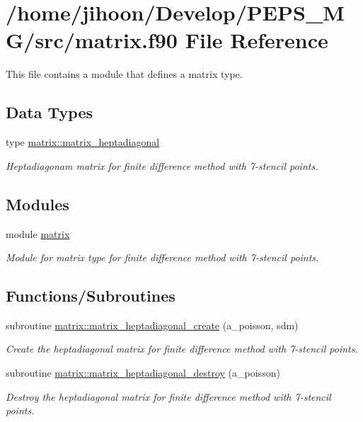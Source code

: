 \hypertarget{matrix_8f90}{}\section{/home/jihoon/\+Develop/\+P\+E\+P\+S\+\_\+\+M\+G/src/matrix.f90 File Reference}
\label{matrix_8f90}


This file contains a module that defines a matrix type.  


\subsection*{Data Types}
\begin{DoxyCompactItemize}
\item 
type \hyperlink{structmatrix_1_1matrix__heptadiagonal}{matrix\+::matrix\+\_\+heptadiagonal}
\begin{DoxyCompactList}\small\item\em Heptadiagonam matrix for finite difference method with 7-\/stencil points. \end{DoxyCompactList}\end{DoxyCompactItemize}
\subsection*{Modules}
\begin{DoxyCompactItemize}
\item 
module \hyperlink{namespacematrix}{matrix}
\begin{DoxyCompactList}\small\item\em Module for matrix type for finite difference method with 7-\/stencil points. \end{DoxyCompactList}\end{DoxyCompactItemize}
\subsection*{Functions/\+Subroutines}
\begin{DoxyCompactItemize}
\item 
subroutine \hyperlink{namespacematrix_af96fcc5a5c79a720967847d6569ce479}{matrix\+::matrix\+\_\+heptadiagonal\+\_\+create} (a\+\_\+poisson, sdm)
\begin{DoxyCompactList}\small\item\em Create the heptadiagonal matrix for finite difference method with 7-\/stencil points. \end{DoxyCompactList}\item 
subroutine \hyperlink{namespacematrix_a1c201958a669deaddeb6aa76251b394f}{matrix\+::matrix\+\_\+heptadiagonal\+\_\+destroy} (a\+\_\+poisson)
\begin{DoxyCompactList}\small\item\em Destroy the heptadiagonal matrix for finite difference method with 7-\/stencil points. \end{DoxyCompactList}\end{DoxyCompactItemize}


